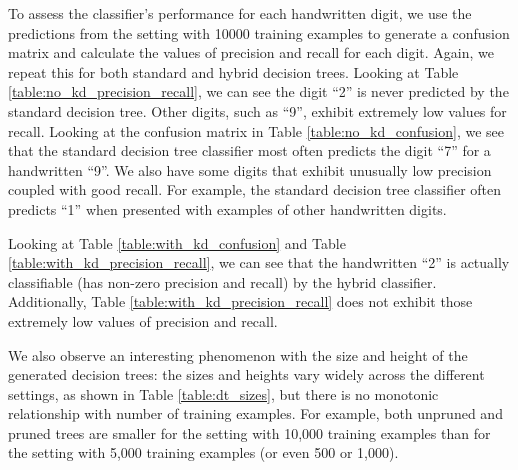 To assess the classifier's performance for each handwritten digit, we use the predictions from the setting with 10000 training examples to generate a confusion matrix and calculate the values of precision and recall for each digit.  Again, we repeat this for both standard and hybrid decision trees.  Looking at Table \ref{table:no_kd_precision_recall}, we can see the digit ``2'' is never predicted by the standard decision tree.  Other digits, such as ``9'', exhibit extremely low values for recall. Looking at the confusion matrix in Table \ref{table:no_kd_confusion}, we see that the standard decision tree classifier most often predicts the digit ``7'' for a handwritten ``9''.  We also have some digits that exhibit unusually low precision coupled with good recall.  For example, the standard decision tree classifier often predicts ``1'' when presented with examples of other handwritten digits.

Looking at Table \ref{table:with_kd_confusion} and Table \ref{table:with_kd_precision_recall}, we can see that the handwritten ``2'' is actually classifiable (has non-zero precision and recall) by the hybrid classifier.  Additionally, Table \ref{table:with_kd_precision_recall} does not exhibit those extremely low values of precision and recall.

We also observe an interesting phenomenon with the size and height of the generated decision trees: the sizes and heights vary widely across the different settings, as shown in Table \ref{table:dt_sizes}, but there is no monotonic relationship with number of training examples.  For example, both unpruned and pruned trees are smaller for the setting with 10,000 training examples than for the setting with 5,000 training examples (or even 500 or 1,000).

